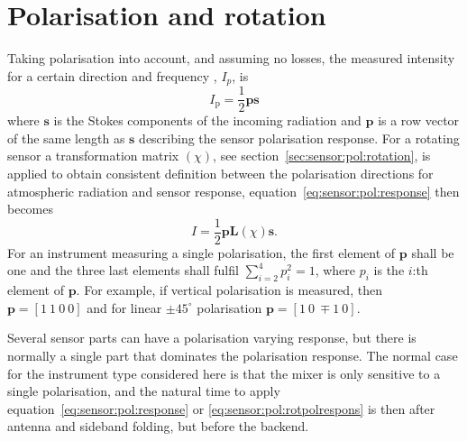 \section{Polarisation and rotation}
\label{sec:sensor:pol}
Taking polarisation into account, and assuming no losses, the measured intensity for a certain direction and frequency , $I_p$, is
\begin{equation}
\label{eq:sensor:pol:response}
  I_\mathrm{p} = \frac{1}{2} \mathbf{p} \mathbf{s}
\end{equation}
where $\mathbf{s}$ is the Stokes components of the incoming radiation and $\mathbf{p}$ is a row vector of the same length as $\mathbf{s}$ describing the sensor polarisation response. For a rotating sensor a transformation matrix $(\chi)$, see section~\ref{sec:sensor:pol:rotation}, is applied to obtain consistent definition between the polarisation directions for atmospheric radiation and sensor response, equation~\ref{eq:sensor:pol:response} then becomes
\begin{equation}
\label{eq:sensor:pol:rotpolrespons}
  I = \frac{1}{2} \mathbf{p} \mathbf{L}(\chi) \mathbf{s}.
\end{equation}
For an instrument measuring a single polarisation, the first element of $\mathbf{p}$ shall be one and the three last elements shall fulfil $\sum_{i=2}^4 p_i^2 = 1$, where
$p_i$ is the $i$:th element of $\mathbf{p}$. For example, if vertical polarisation is measured, then $\mathbf{p}=[1\ 1\ 0\ 0]$ and for linear $\pm45^\circ$ polarisation $\mathbf{p}=[1\ 0\ \mp\!\!1\ 0]$.  

Several sensor parts can have a polarisation varying response, but there is normally a single part that dominates the polarisation response. The normal case for the instrument type considered here is that the mixer is only sensitive to a single polarisation, and the natural time to apply equation~\ref{eq:sensor:pol:response} or \ref{eq:sensor:pol:rotpolrespons} is then after antenna and sideband folding, but before the backend. 


